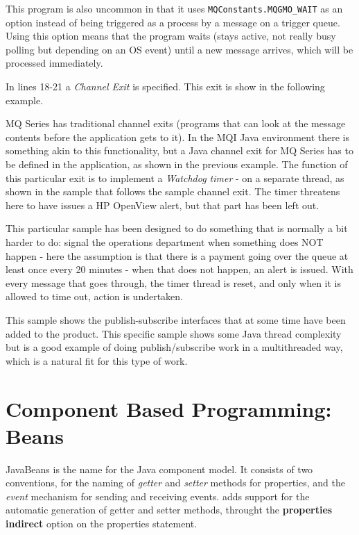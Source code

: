This program is also uncommon in that it uses
\texttt{MQConstants.MQGMO\_WAIT} as an option instead of being
triggered as a process by a message on a trigger queue. Using this
option means that the program waits (stays active, not really busy polling
but depending on an OS event) until a new
message arrives, which will be processed immediately.

In lines 18-21 a \emph{Channel Exit} is specified. This exit is show
in the following example.

 
MQ Series has traditional channel exits (programs that can look at the
message contents before the application gets to it). In the MQI Java
environment there is something akin to this functionality, but a Java
channel exit for MQ Series has to be defined in the application, as
shown in the previous example. The function of this particular exit is
to implement a \emph{Watchdog timer} - on a separate thread, as shown
in the sample that follows the sample channel exit. The timer
threatens here to have issues a HP OpenView alert, but that part has
been left out.

This particular sample has been designed to do something that is
normally a bit harder
to do: signal the operations department when something does NOT happen
- here the assumption is that there is a payment going over the queue
at least once every 20 minutes - when that does not happen, an alert
is issued. With every message that goes through, the timer thread is
reset, and only when it is allowed to time out, action is undertaken.


This sample shows the publish-subscribe interfaces that at some time have been
added to the product. This specific sample shows some Java thread
complexity but is a good example of doing publish/subscribe work in a
multithreaded way, which is a natural fit for this type of work.



\chapter{Component Based Programming: Beans}
JavaBeans is the name for the Java component model. It consists of two
conventions, for the naming of \emph{getter} and \emph{setter} methods
for properties, and the \emph{event} mechanism for sending and
receiving events. \nr{}adds support for the automatic generation of
getter and setter methods, throught the \textbf{properties indirect}
option on the properties statement.



